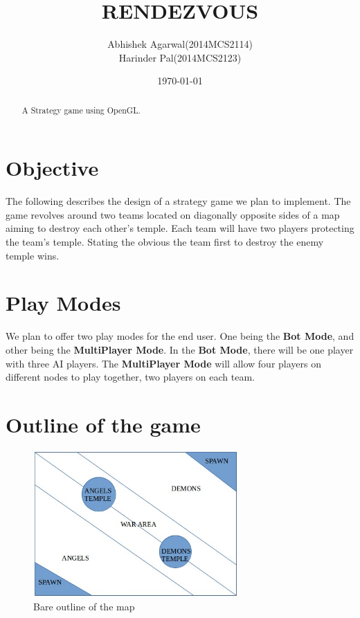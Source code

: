 \documentclass[a4paper]{article}
\title{RENDEZVOUS}
\author{Abhishek Agarwal(2014MCS2114)
\\ Harinder Pal(2014MCS2123)}
\date{\today}
\begin{document}
\maketitle

\begin{abstract}
\centering A Strategy game using OpenGL.
\end{abstract}

\section{Objective}

The following describes the design of a strategy game we plan to implement. The game revolves around two teams located on diagonally opposite sides of a map aiming to destroy each other's temple. Each team will have two players protecting the team's temple. Stating the obvious the team first to destroy the enemy temple wins.

\section{Play Modes}

We plan to offer two play modes for the end user. One being the \textbf{Bot Mode}, and other being the \textbf{MultiPlayer Mode}. In the \textbf{Bot Mode}, there will be one player with three AI players. The \textbf{MultiPlayer Mode} will allow four players on different nodes to play together, two players on each team.

\section{Outline of the game}
\begin{figure}[htp]
\centering
\includegraphics[width=0.7\textwidth]{outline.jpg}
\caption{\label{fig:outline}Bare outline of the map}
\end{figure}
\end{document}
